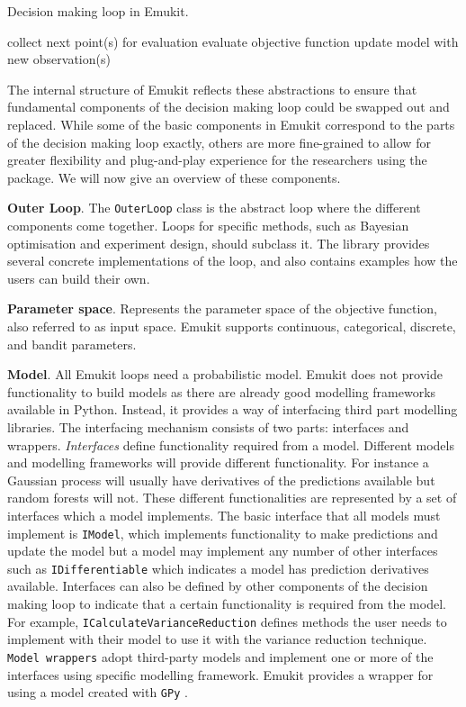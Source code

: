 \begin{algorithm}[H]
  \caption{Decision making loop in Emukit.}
  \label{alg:emukit-loop}
  \begin{algorithmic}[1]
      \State collect next point(s) for evaluation
      \State evaluate objective function
      \State update model with new observation(s)
    \EndWhile
  \end{algorithmic}
\end{algorithm}

The internal structure of Emukit reflects these abstractions to ensure that fundamental components of the decision making loop could be swapped out and replaced. While some of the basic components in Emukit correspond to the parts of the decision making loop exactly, others are more fine-grained to allow for greater flexibility and plug-and-play experience for the researchers using the package. We will now give an overview of these components.

\textbf{Outer Loop}. The \texttt{OuterLoop} class is the abstract loop where the different components come together. Loops for specific methods, such as Bayesian optimisation and experiment design, should subclass it. The library provides several concrete implementations of the loop, and also contains examples how the users can build their own.

\textbf{Parameter space}. Represents the parameter space of the objective function, also referred to as input space. Emukit supports continuous, categorical, discrete, and bandit parameters.

\textbf{Model}. All Emukit loops need a probabilistic model. Emukit does not provide functionality to build models as there are already good modelling frameworks available in Python. Instead, it provides a way of interfacing third part modelling libraries. The interfacing mechanism consists of two parts: interfaces and wrappers. \textit{Interfaces} define functionality required from a model. Different models and modelling frameworks will provide different functionality. For instance a Gaussian process will usually have derivatives of the predictions available but random forests will not. These different functionalities are represented by a set of interfaces which a model implements. The basic interface that all models must implement is \texttt{IModel}, which implements functionality to make predictions and update the model but a model may implement any number of other interfaces such as \texttt{IDifferentiable} which indicates a model has prediction derivatives available. Interfaces can also be defined by other components of the decision making loop to indicate that a certain functionality is required from the model. For example, \texttt{ICalculateVarianceReduction} defines methods the user needs to implement with their model to use it with the variance reduction technique. \texttt{Model wrappers} adopt third-party models and implement one or more of the interfaces using specific modelling framework. Emukit provides a wrapper for using a model created with \texttt{GPy} \cite{gpy2014}.

